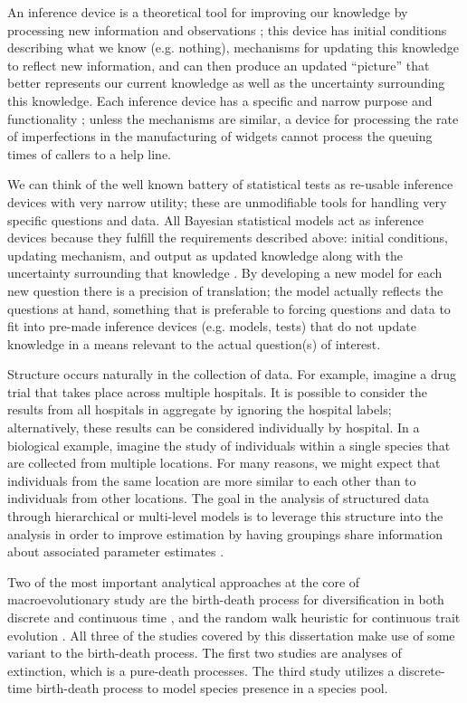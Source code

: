 An inference device is a theoretical tool for improving our knowledge by processing new information and observations \citep{McElreath2016,Jaynes2003a}; this device has initial conditions describing what we know (e.g. nothing), mechanisms for updating this knowledge to reflect new information, and can then produce an updated ``picture'' that better represents our current knowledge as well as the uncertainty surrounding this knowledge. Each inference device has a specific and narrow purpose and functionality \citep{McElreath2016}; unless the mechanisms are similar, a device for processing the rate of imperfections in the manufacturing of widgets cannot process the queuing times of callers to a help line.  

We can think of the well known battery of statistical tests \citep{Sokal2011} as re-usable inference devices with very narrow utility; these are unmodifiable tools for handling very specific questions and data. All Bayesian statistical models act as inference devices because they fulfill the requirements described above: initial conditions, updating mechanism, and output as updated knowledge along with the uncertainty surrounding that knowledge \citep{McElreath2016,Jaynes2003a}. By developing a new model for each new question there is a precision of translation; the model actually reflects the questions at hand, something that is preferable to forcing questions and data to fit into pre-made inference devices (e.g. models, tests) that do not update knowledge in a means relevant to the actual question(s) of interest.

Structure occurs naturally in the collection of data. For example, imagine a drug trial that takes place across multiple hospitals. It is possible to consider the results from all hospitals in aggregate by ignoring the hospital labels; alternatively, these results can be considered individually by hospital. In a biological example, imagine the study of individuals within a single species that are collected from multiple locations. For many reasons, we might expect that individuals from the same location are more similar to each other than to individuals from other locations. The goal in the analysis of structured data through hierarchical or multi-level models is to leverage this structure into the analysis in order to improve estimation by having groupings share information about associated parameter estimates \citep{Gelman2013d,McElreath2016}. 

Two of the most important analytical approaches at the core of macroevolutionary study are the birth-death process for diversification in both discrete and continuous time \citep{Raup1973,Raup1985,Nee1992,Nee1994a,Nee2001,Nee2006b,Stadler2013b}, and the random walk heuristic for continuous trait evolution \citep{Raup1974a,Felsenstein1985b,Bookstein1987b,Gingerich1993,Roopnarine2001a,Roopnarine2003b,Roopnarine1999,Sheets2001,Hunt2006a,Hunt2007a}. All three of the studies covered by this dissertation make use of some variant to the birth-death process. The first two studies are analyses of extinction, which is a pure-death processes. The third study utilizes a discrete-time birth-death process to model species presence in a species pool.

